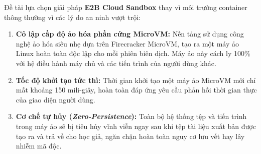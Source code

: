 Đề tài lựa chọn giải pháp \textbf{E2B Cloud Sandbox} thay vì môi trường container thông thường vì các lý do an ninh vượt trội:
\begin{enumerate}[label=\textbf{(\arabic*)}]
    \item \textbf{Cô lập cấp độ ảo hóa phần cứng MicroVM:} Nền tảng sử dụng công nghệ ảo hóa siêu nhẹ dựa trên Firecracker MicroVM, tạo ra một máy ảo Linux hoàn toàn độc lập cho mỗi phiên biên dịch. Máy ảo này cách ly 100\% với hệ điều hành máy chủ và các tiến trình của người dùng khác.
    \item \textbf{Tốc độ khởi tạo tức thì:} Thời gian khởi tạo một máy ảo MicroVM mới chỉ mất khoảng 150 mili-giây, hoàn toàn đáp ứng yêu cầu phản hồi thời gian thực của giao diện người dùng.
    \item \textbf{Cơ chế tự hủy (\textit{Zero-Persistence}):} Toàn bộ hệ thống tệp và tiến trình trong máy ảo sẽ bị tiêu hủy vĩnh viễn ngay sau khi tệp tài liệu xuất bản được tạo ra và trả về cho học giả, ngăn chặn hoàn toàn nguy cơ lưu vết hay lây nhiễm mã độc.
\end{enumerate}
